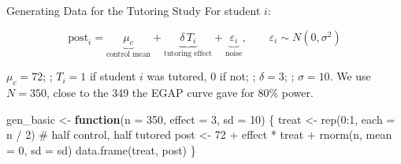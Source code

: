 \documentclass[
  ignorenonframetext,
  aspectratio=169,
]{beamer}
\newenvironment{Shaded}{\begin{snugshade}}{\end{snugshade}}
\newcommand{\AttributeTok}[1]{\textcolor[rgb]{0.40,0.45,0.13}{#1}}
\newcommand{\CommentTok}[1]{\textcolor[rgb]{0.37,0.37,0.37}{#1}}
\newcommand{\ControlFlowTok}[1]{\textcolor[rgb]{0.00,0.23,0.31}{\textbf{#1}}}
\newcommand{\DecValTok}[1]{\textcolor[rgb]{0.68,0.00,0.00}{#1}}
\newcommand{\FunctionTok}[1]{\textcolor[rgb]{0.28,0.35,0.67}{#1}}
\newcommand{\NormalTok}[1]{\textcolor[rgb]{0.00,0.23,0.31}{#1}}
\newcommand{\OtherTok}[1]{\textcolor[rgb]{0.00,0.23,0.31}{#1}}
\newcommand{\SpecialCharTok}[1]{\textcolor[rgb]{0.37,0.37,0.37}{#1}}
\begin{document}
\begin{frame}[fragile]{Generating Data for the Tutoring Study}
\label{generating-data-for-the-tutoring-study}
For student \(i\):

\[
\text{post}_i = \underbrace{\mu_c}_{\text{control mean}} + \underbrace{\delta \, T_i}_{\text{tutoring effect}} + \underbrace{\varepsilon_i}_{\text{noise}}, \qquad \varepsilon_i \sim N(0, \sigma^2)
\]

\footnotesize \(\mu_c = 72\); ; \(T_i = 1\) if student \(i\) was
tutored, 0 if not; ; \(\delta = 3\); ; \(\sigma = 10\). We use
\(N = 350\), close to the 349 the EGAP curve gave for 80\% power.

\begin{Shaded}
\begin{Highlighting}[]
\NormalTok{gen\_basic }\OtherTok{\textless{}{-}} \ControlFlowTok{function}\NormalTok{(}\AttributeTok{n =} \DecValTok{350}\NormalTok{, }\AttributeTok{effect =} \DecValTok{3}\NormalTok{, }\AttributeTok{sd =} \DecValTok{10}\NormalTok{) \{}
\NormalTok{  treat }\OtherTok{\textless{}{-}} \FunctionTok{rep}\NormalTok{(}\DecValTok{0}\SpecialCharTok{:}\DecValTok{1}\NormalTok{, }\AttributeTok{each =}\NormalTok{ n }\SpecialCharTok{/} \DecValTok{2}\NormalTok{) }\CommentTok{\# half control, half tutored}
\NormalTok{  post }\OtherTok{\textless{}{-}} \DecValTok{72} \SpecialCharTok{+}\NormalTok{ effect }\SpecialCharTok{*}\NormalTok{ treat }\SpecialCharTok{+} \FunctionTok{rnorm}\NormalTok{(n, }\AttributeTok{mean =} \DecValTok{0}\NormalTok{, }\AttributeTok{sd =}\NormalTok{ sd)}
  \FunctionTok{data.frame}\NormalTok{(treat, post)}
\NormalTok{\}}
\end{Highlighting}
\end{Shaded}
\end{frame}
\end{document}
